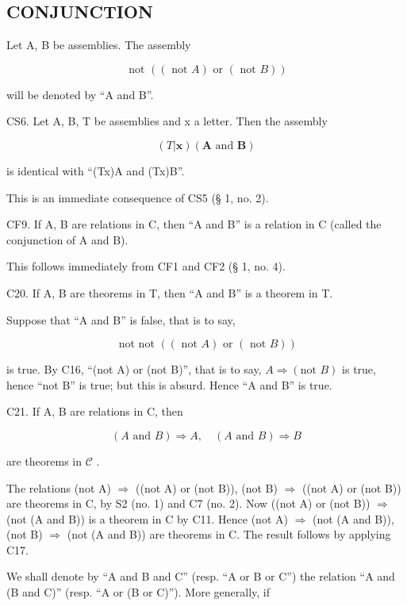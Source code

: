 \subsection{CONJUNCTION}

Let A, B be assemblies. The assembly

\[
\text { not } ((\text { not } A) \text { or } (\text { not } B))
\]

will be denoted by ``A and B''.

CS6. Let A, B, T be assemblies and x a letter. Then the assembly

\[
(T | \boldsymbol {x}) (\boldsymbol {A} \text { and } \boldsymbol {B})
\]

is identical with ``(T\textbar x)A and (T\textbar x)B''.

This is an immediate consequence of CS5 (§ 1, no. 2).

CF9. If A, B are relations in C, then ``A and B'' is a relation in C (called the conjunction of A and B).

This follows immediately from CF1 and CF2 (§ 1, no. 4).

C20. If A, B are theorems in T, then ``A and B'' is a theorem in T.

Suppose that ``A and B'' is false, that is to say,

\[
\text { not   not   } ((\text { not   } A) \text {   or   } (\text { not   } B))
\]

is true. By C16, ``(not A) or (not B)'', that is to say, \(A \Longrightarrow (\text{not } B)\) is true, hence ``not B'' is true; but this is absurd. Hence ``A and B'' is true.

C21. If A, B are relations in C, then

\[
(A \text {   and   } B) \Longrightarrow A, \quad (A \text {   and   } B) \Longrightarrow B
\]

are theorems in \(\mathcal{C}\) .

The relations (not A) \(\Longrightarrow\) ((not A) or (not B)), (not B) \(\Longrightarrow\) ((not A) or (not B)) are theorems in C, by S2 (no. 1) and C7 (no. 2). Now ((not A) or (not B)) \(\Longrightarrow\) (not (A and B)) is a theorem in C by C11. Hence (not A) \(\Longrightarrow\) (not (A and B)), (not B) \(\Longrightarrow\) (not (A and B)) are theorems in C. The result follows by applying C17.

We shall denote by ``A and B and C'' (resp. ``A or B or C'') the relation ``A and (B and C)'' (resp. ``A or (B or C)''). More generally, if

